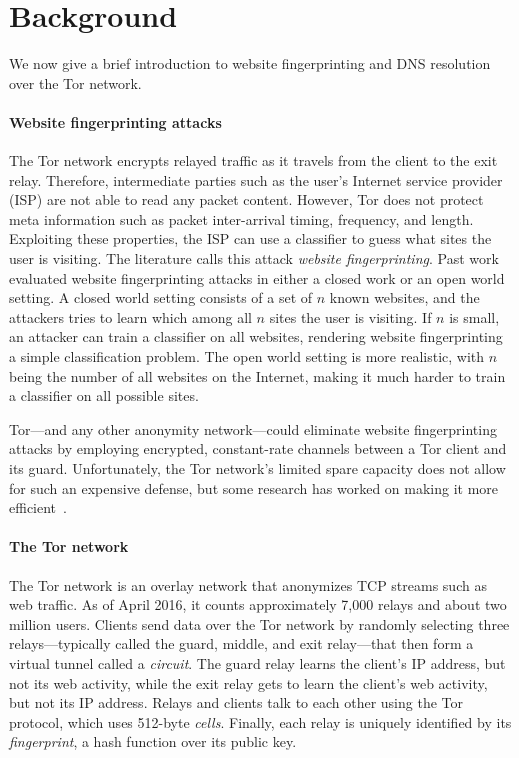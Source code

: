 \section{Background}
\label{sec:background}
We now give a brief introduction to website fingerprinting and DNS resolution
over the Tor network.

\paragraph{Website fingerprinting attacks}
The Tor network encrypts relayed traffic as it travels from the client to the
exit relay.  Therefore, intermediate parties such as the user's Internet service
provider (ISP) are not able to read any packet content.  However, Tor does not
protect meta information such as packet inter-arrival timing, frequency, and
length.  Exploiting these properties, the ISP can use a classifier to guess what
sites the user is visiting.  The literature calls this attack \emph{website
fingerprinting}.  Past work evaluated website fingerprinting attacks in either a
closed work or an open world setting.  A closed world setting consists of a set
of $n$ known websites, and the attackers tries to learn which among all $n$
sites the user is visiting.  If $n$ is small, an attacker can train a classifier
on all websites, rendering website fingerprinting a simple classification
problem.  The open world setting is more realistic, with $n$ being the number of
all websites on the Internet, making it much harder to train a classifier on all
possible sites.

Tor---and any other anonymity network---could eliminate website fingerprinting
attacks by employing encrypted, constant-rate channels between a Tor client and
its guard.  Unfortunately, the Tor network's limited spare capacity does not
allow for such an expensive defense, but some research has worked on making it
more efficient~\cite{Cai2014a,DBLP:journals/corr/JuarezIPDW15,WangThesis}.

\paragraph{The Tor network}
The Tor network is an overlay network that anonymizes TCP streams such as web
traffic.  As of April 2016, it counts approximately 7,000 relays and about two
million users.  Clients send data over the Tor network by randomly selecting
three relays---typically called the guard, middle, and exit relay---that then
form a virtual tunnel called a \emph{circuit}.  The guard relay learns the
client's IP address, but not its web activity, while the exit relay gets to
learn the client's web activity, but not its IP address.  Relays and clients
talk to each other using the Tor protocol, which uses 512-byte \emph{cells}.
Finally, each relay is uniquely identified by its \emph{fingerprint}, a hash
function over its public key.

